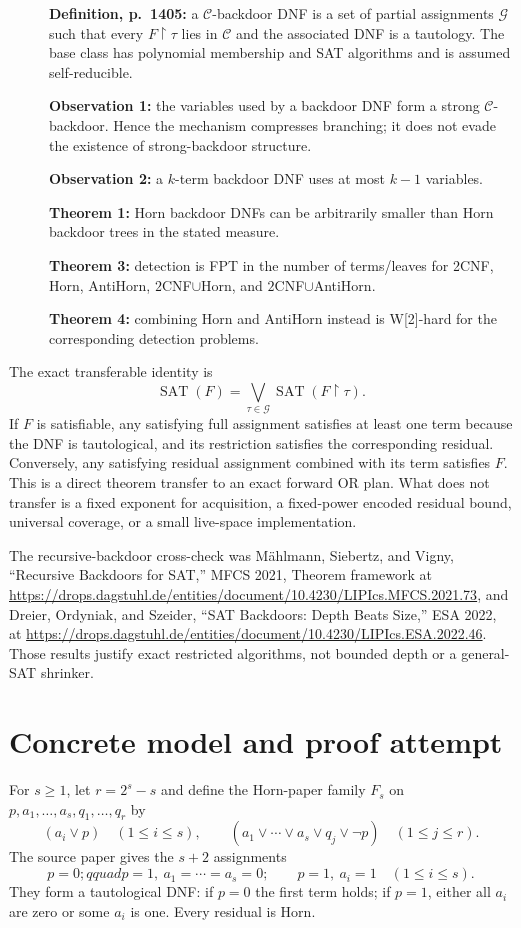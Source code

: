 \documentclass[11pt]{article}
\newcommand{\SAT}{\operatorname{SAT}}
\begin{document}
\begin{description}
\item[] \textbf{Definition, p.~1405:} a $\mathcal C$-backdoor DNF is a set
of partial assignments $\mathcal G$ such that every
$F\upharpoonright\tau$ lies in $\mathcal C$ and the associated DNF is a
tautology.  The base class has polynomial membership and SAT algorithms and
is assumed self-reducible.
\item[] \textbf{Observation 1:} the variables used by a backdoor DNF form a
strong $\mathcal C$-backdoor.  Hence the mechanism compresses branching; it
does not evade the existence of strong-backdoor structure.
\item[] \textbf{Observation 2:} a $k$-term backdoor DNF uses at most $k-1$
variables.
\item[] \textbf{Theorem 1:} Horn backdoor DNFs can be arbitrarily smaller
than Horn backdoor trees in the stated measure.
\item[] \textbf{Theorem 3:} detection is FPT in the number of terms/leaves
for 2CNF, Horn, AntiHorn, $2$CNF$\cup$Horn, and
$2$CNF$\cup$AntiHorn.
\item[] \textbf{Theorem 4:} combining Horn and AntiHorn instead is
W[2]-hard for the corresponding detection problems.
\end{description}

The exact transferable identity is
\[
 \SAT(F)=\bigvee_{\tau\in\mathcal G}
 \SAT(F\upharpoonright\tau).
\]
If $F$ is satisfiable, any satisfying full assignment satisfies at least one
term because the DNF is tautological, and its restriction satisfies the
corresponding residual.  Conversely, any satisfying residual assignment
combined with its term satisfies $F$.  This is a direct theorem transfer to
an exact forward OR plan.  What does not transfer is a fixed exponent for
acquisition, a fixed-power encoded residual bound, universal coverage, or a
small live-space implementation.

The recursive-backdoor cross-check was M\"ahlmann, Siebertz, and Vigny,
``Recursive Backdoors for SAT,'' MFCS 2021, Theorem framework at
\url{https://drops.dagstuhl.de/entities/document/10.4230/LIPIcs.MFCS.2021.73},
and Dreier, Ordyniak, and Szeider, ``SAT Backdoors: Depth Beats Size,'' ESA
2022, at
\url{https://drops.dagstuhl.de/entities/document/10.4230/LIPIcs.ESA.2022.46}.
Those results justify exact restricted algorithms, not bounded depth or a
general-SAT shrinker.
\cite{maehlmann2021,dreier2022}

\section*{Concrete model and proof attempt}
For $s\ge1$, let $r=2^s-s$ and define the Horn-paper family $F_s$ on
$p,a_1,\ldots,a_s,q_1,\ldots,q_r$ by
\[
 (a_i\vee p)\quad(1\le i\le s),\qquad
 (a_1\vee\cdots\vee a_s\vee q_j\vee\neg p)
 \quad(1\le j\le r).
\]
The source paper gives the $s+2$ assignments
\[
 p=0;qquad p=1,\ a_1=\cdots=a_s=0;\qquad
 p=1,\ a_i=1\quad(1\le i\le s).
\]
They form a tautological DNF: if $p=0$ the first term holds; if $p=1$,
either all $a_i$ are zero or some $a_i$ is one.  Every residual is Horn.
\end{document}

